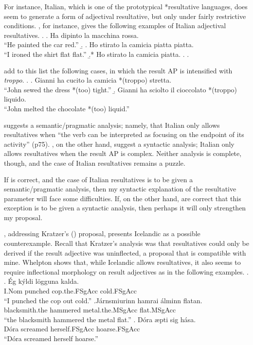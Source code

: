 For instance, Italian, which is one of the prototypical *resultative languages, does seem to generate a form of adjectival resultative, but only under fairly restrictive conditions.
\textcite{napoli1992secondary}, for instance, gives the following examples of Italian adjectival resultatives.
\ex.
\a. Ha dipinto la macchina rossa.\\
``He painted the car red.''
\b. 
	\a. Ho stirato la camicia piatta piatta.\\
	``I ironed the shirt flat flat.''
	\b.* Ho stirato la camicia piatta.
	\z.
\z.

\textcite{folli2005prepositions} add to this list the following cases, in which the result AP is intensified with \textit{troppo}.
\ex.
\a. Gianni ha cucito la camicia *(troppo) stretta.\\
``John sewed the dress *(too) tight.''
\b. Gianni ha sciolto il cioccolato *(troppo) liquido.\\
``John melted the chocolate *(too) liquid.''

\textcite{napoli1992secondary} suggests a semantic/pragmatic analysis; namely, that Italian only allows resultatives when ``the verb can be interpreted as focusing on the endpoint of its activity'' (p75).
\textcite{folli2005prepositions}, on the other hand, suggest a syntactic analysis; Italian only allows resultatives when the result AP is complex.
Neither analysis is complete, though, and the case of Italian resultatives remains a puzzle.

If \citeauthor{napoli1992secondary} is correct, and the case of Italian resultatives is to be given a semantic/pragmatic analysis, then my syntactic explanation of the resultative parameter will face some difficulties.
If, on the other hand, \citeauthor{folli2005prepositions} are correct that this exception is to be given a syntactic analysis, then perhaps it will only strengthen my proposal.

\textcite{whelpton2007building}, addressing Kratzer's (\citeyear{kratzer2004building}) proposal, presents Icelandic as a possible counterexample. 
Recall that Kratzer's analysis was that resultatives could only be derived if the result adjective was uninflected, a proposal that is compatible with mine.
Whelpton shows that, while Icelandic allows resultatives, it also seems to require inflectional morphology on result adjectives as in the following examples.
\ex.
\ag. \'Eg k\'yldi l\"ogguna kalda.\\
I.Nom punched cop.the.FSgAcc cold.FSgAcc\\
``I punched the cop out cold.''
\bg.J\'{a}rnsmi\dh{}urinn hamra\dh{}i \'{a}lminn flatan.\\
blacksmith.the hammered metal.the.MSgAcc flat.MSgAcc\\
``the blacksmith hammered the metal flat.''
\bg. D\'{o}ra \ae{}pti sig h\'{a}sa.\\
D\'{o}ra screamed herself.FSgAcc hoarse.FSgAcc\\
``D\'{o}ra screamed herself hoarse.''

